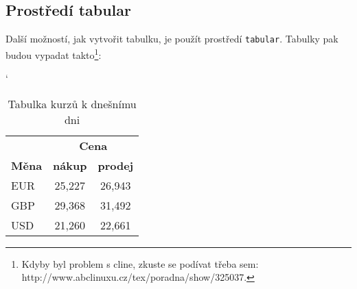 \documentclass[a4paper, 11pt]{article}
\begin{document}
\subsection{Prostředí tabular}
Další možností, jak vytvořit tabulku, je použít prostředí \verb!tabular!. Tabulky pak 
budou vypadat takto\footnote{Kdyby byl problem s cline, zkuste se podívat třeba sem: http://www.abclinuxu.cz/tex/poradna/show/325037.}:
\\
\begin{table}[h]
    \catcode`
    \setlength{\arrayrulewidth}{0,3mm}
    \begin{center}
        \begin{tabular}{|l|c|c|} 
            \hline
            \multicolumn{1}{|c|}{} & \multicolumn{2}{c|}{\textbf{Cena}} \\
            \cline{2-3}
            {\textbf{Měna}} & \textbf{nákup} & \textbf{prodej} \\
            \hline
            EUR & 25,227 & 26,943 \\ 
            GBP & 29,368 & 31,492 \\ 
            USD & 21,260 & 22,661 \\ 
            \hline
        \end{tabular}
    \caption{Tabulka kurzů k dnešnímu dni}
    \end{center}
\end{table}
\end{document}
